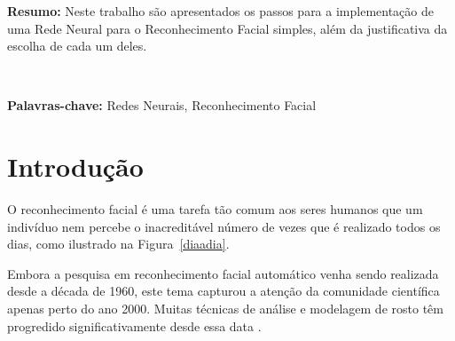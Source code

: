 \documentclass[hidelinks,11pt,twocolumn]{article}
\begin{document}

\textbf{Resumo:} Neste trabalho são apresentados os passos para a implementação de uma Rede Neural para o Reconhecimento Facial simples, além da justificativa da escolha de cada um deles.

\

\textbf{Palavras-chave:} Redes Neurais, Reconhecimento Facial

\section{Introdução}

O reconhecimento facial é uma tarefa tão comum aos seres humanos que um indivíduo nem percebe o inacreditável número de vezes que é realizado todos os dias, como ilustrado na Figura~\ref{diaadia}. 

Embora a pesquisa em reconhecimento facial automático venha sendo realizada desde a década de 1960, este tema capturou a atenção da comunidade científica apenas perto do ano 2000. Muitas técnicas de análise e modelagem de rosto têm progredido significativamente desde essa data \cite{fagertun}.
\end{document}
